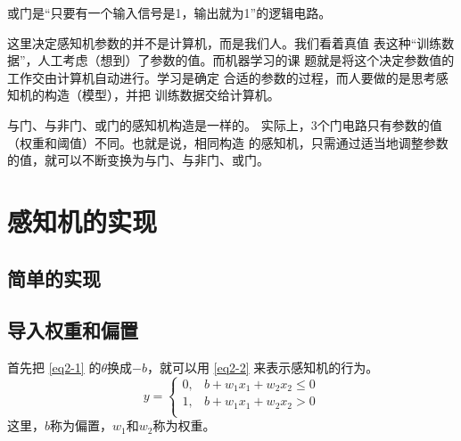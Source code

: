 或门是“只要有一个输入信号是1，输出就为1”的逻辑电路。

\begin{tcolorbox}
    这里决定感知机参数的并不是计算机，而是我们人。我们看着真值
    表这种“训练数据”，人工考虑（想到）了参数的值。而机器学习的课
    题就是将这个决定参数值的工作交由计算机自动进行。学习是确定
    合适的参数的过程，而人要做的是思考感知机的构造（模型），并把
    训练数据交给计算机。
\end{tcolorbox}

与门、与非门、或门的感知机构造是一样的。
实际上，3个门电路只有参数的值（权重和阈值）不同。也就是说，相同构造
的感知机，只需通过适当地调整参数的值，就可以不断变换为与门、与非门、或门。

\section{感知机的实现}
\subsection{简单的实现}
\subsection{导入权重和偏置}
首先把 \autoref{eq2-1} 的$\theta$换成$-b$，就可以用 \autoref{eq2-2} 来表示感知机的行为。
\begin{equation}
    \label{eq2-2}
    y = \left \{
    \begin{array}{ll}
        0, & b+w_1x_1+w_2x_2  \leq 0 \\
        1, & b+w_1x_1+w_2x_2 > 0     \\
    \end{array}
    \right.
\end{equation}
这里，$b$称为偏置，$w_1$和$w_2$称为权重。
